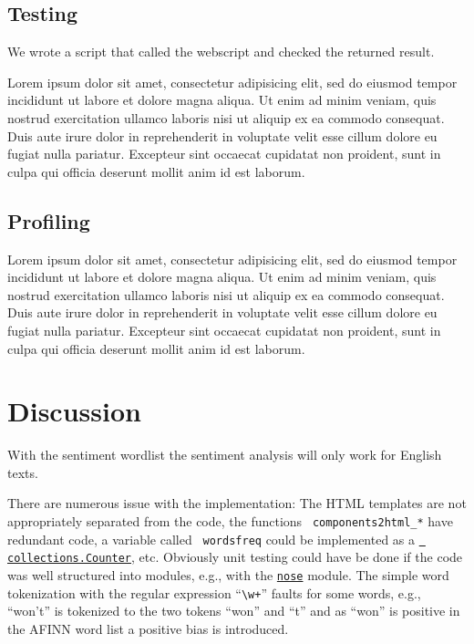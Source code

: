 \documentclass[10pt]{IEEEtran}
\begin{document}
\subsection{Testing}

We wrote a script that called the webscript and checked the returned
result. 

Lorem ipsum dolor sit amet, consectetur adipisicing elit, sed do
eiusmod tempor incididunt ut labore et dolore magna aliqua. Ut enim ad
minim veniam, quis nostrud exercitation ullamco laboris nisi ut
aliquip ex ea commodo consequat. Duis aute irure dolor in
reprehenderit in voluptate velit esse cillum dolore eu fugiat nulla
pariatur. Excepteur sint occaecat cupidatat non proident, sunt in
culpa qui officia deserunt mollit anim id est laborum. 


\subsection{Profiling}


Lorem ipsum dolor sit amet, consectetur adipisicing elit, sed do
eiusmod tempor incididunt ut labore et dolore magna aliqua. Ut enim ad
minim veniam, quis nostrud exercitation ullamco laboris nisi ut
aliquip ex ea commodo consequat. Duis aute irure dolor in
reprehenderit in voluptate velit esse cillum dolore eu fugiat nulla
pariatur. Excepteur sint occaecat cupidatat non proident, sunt in
culpa qui officia deserunt mollit anim id est laborum.


\section{Discussion}

With the sentiment wordlist the sentiment analysis will only work for
English texts.

There are numerous issue with the implementation: The HTML templates
are not appropriately separated from the code, the functions {\tt
  components2html\_*} have redundant code, a variable called {\tt
  wordsfreq} could be implemented as a
\href{http://docs.python.org/dev/library/collections#collections.Counter}{\tt
  collections.Counter}, etc. 
Obviously unit testing could have be done if the code was well
structured into modules, e.g., with the
\href{https://nose.readthedocs.org/en/latest/}{\tt nose} module. 
The simple word tokenization with the regular expression ``\verb!\w+!''
faults for some words, e.g., ``won't'' is tokenized to the two tokens ``won'' and
``t'' and as ``won'' is positive in the AFINN word list a positive
bias is introduced. 
\end{document}
